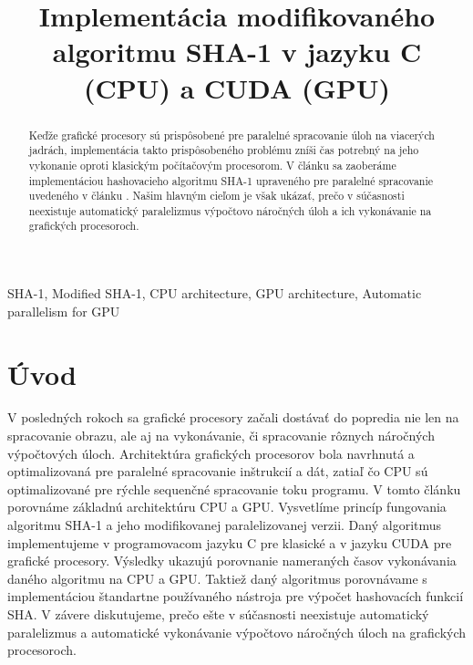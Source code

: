 \documentclass[conference]{IEEEtran}
\begin{document}
%
\title{Implementácia modifikovaného algoritmu SHA-1 v jazyku C (CPU) a CUDA (GPU)}

\author{
}


\maketitle

\begin{abstract}
Keďže grafické procesory sú prispôsobené pre paralelné spracovanie úloh na viacerých jadrách, implementácia takto prispôsobeného problému zníši čas potrebný na jeho vykonanie oproti klasickým počítačovým procesorom. V článku sa zaoberáme implementáciou hashovacieho algoritmu SHA-1 upraveného pre paralelné spracovanie uvedeného v článku \cite{MSHA}. Našim hlavným cieľom je však ukázať, prečo v súčasnosti neexistuje automatický paralelizmus výpočtovo náročných úloh a ich vykonávanie na grafických procesoroch.
\end{abstract}

\begin{IEEEkeywords}
SHA-1, Modified SHA-1, CPU architecture, GPU architecture, Automatic parallelism for GPU 
\end{IEEEkeywords}

\IEEEpeerreviewmaketitle

\section{Úvod}

V posledných rokoch sa grafické procesory začali dostávať do popredia nie len na spracovanie obrazu, ale aj na vykonávanie, či spracovanie rôznych náročných výpočtových úloch. Architektúra grafických procesorov bola navrhnutá a optimalizovaná pre paralelné spracovanie inštrukcií a dát, zatiaľ čo CPU sú optimalizované pre rýchle sequenčné spracovanie toku programu. V tomto článku porovnáme základnú architektúru CPU a GPU. Vysvetlíme princíp fungovania algoritmu SHA-1 a jeho modifikovanej paralelizovanej verzii. Daný algoritmus implementujeme v programovacom jazyku C pre klasické a v jazyku CUDA pre grafické procesory. Výsledky ukazujú porovnanie nameraných časov vykonávania daného algoritmu na CPU a GPU. Taktiež daný algoritmus porovnávame s implementáciou štandartne používaného nástroja pre výpočet hashovacích funkcií SHA. V závere diskutujeme, prečo ešte v súčasnosti neexistuje automatický paralelizmus a automatické vykonávanie výpočtovo náročných úloch na grafických procesoroch.
\end{document}

